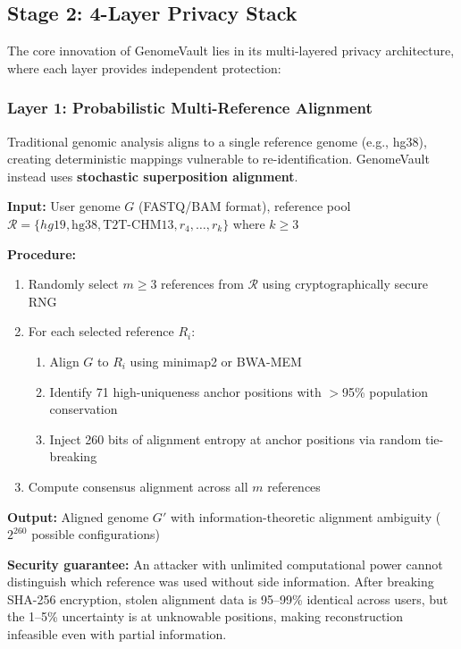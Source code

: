 \documentclass[12pt,a4paper]{article}
\begin{document}
\subsection{Stage 2: 4-Layer Privacy Stack}

The core innovation of GenomeVault lies in its multi-layered privacy architecture, where each layer provides independent protection:

\subsubsection{Layer 1: Probabilistic Multi-Reference Alignment}

Traditional genomic analysis aligns to a single reference genome (e.g., hg38), creating deterministic mappings vulnerable to re-identification. GenomeVault instead uses \textbf{stochastic superposition alignment}.

\textbf{Input:} User genome $G$ (FASTQ/BAM format), reference pool $\mathcal{R} = \{hg19, \text{hg38}, \text{T2T-CHM13}, r_4, \ldots, r_k\}$ where $k \geq 3$

\textbf{Procedure:}
\begin{enumerate}
\item Randomly select $m \geq 3$ references from $\mathcal{R}$ using cryptographically secure RNG
\item For each selected reference $R_i$:
  \begin{enumerate}
  \item Align $G$ to $R_i$ using minimap2 or BWA-MEM
  \item Identify 71 high-uniqueness anchor positions with $>$95\% population conservation
  \item Inject 260 bits of alignment entropy at anchor positions via random tie-breaking
  \end{enumerate}
\item Compute consensus alignment across all $m$ references
\end{enumerate}

\textbf{Output:} Aligned genome $G'$ with information-theoretic alignment ambiguity ($2^{260}$ possible configurations)

\textbf{Security guarantee:} An attacker with unlimited computational power cannot distinguish which reference was used without side information. After breaking SHA-256 encryption, stolen alignment data is 95--99\% identical across users, but the 1--5\% uncertainty is at unknowable positions, making reconstruction infeasible even with partial information.
\end{document}
